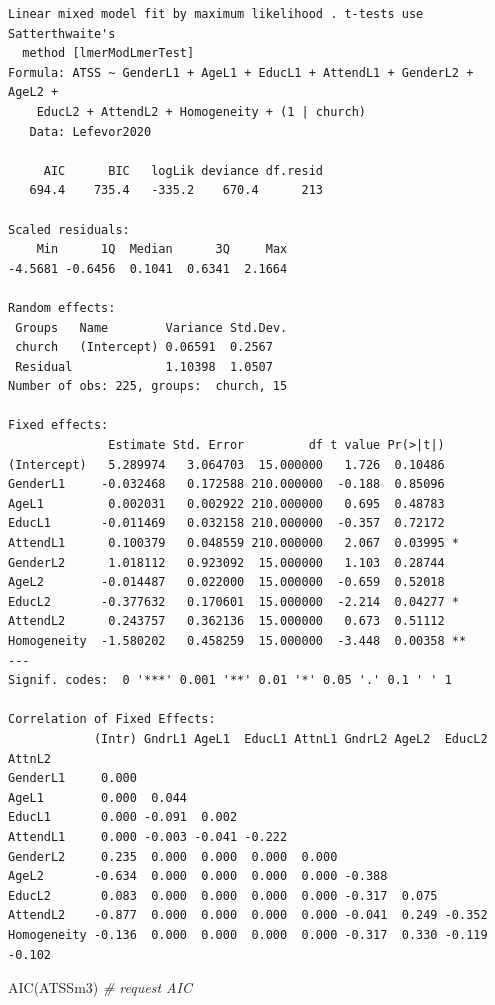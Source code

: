 \documentclass[
  english,
]{book}
\newenvironment{Shaded}{\begin{snugshade}}{\end{snugshade}}
\newcommand{\CommentTok}[1]{\textcolor[rgb]{0.56,0.35,0.01}{\textit{#1}}}
\newcommand{\FunctionTok}[1]{\textcolor[rgb]{0.00,0.00,0.00}{#1}}
\newcommand{\NormalTok}[1]{#1}
\begin{document}
\begin{verbatim}
Linear mixed model fit by maximum likelihood . t-tests use Satterthwaite's
  method [lmerModLmerTest]
Formula: ATSS ~ GenderL1 + AgeL1 + EducL1 + AttendL1 + GenderL2 + AgeL2 +  
    EducL2 + AttendL2 + Homogeneity + (1 | church)
   Data: Lefevor2020

     AIC      BIC   logLik deviance df.resid 
   694.4    735.4   -335.2    670.4      213 

Scaled residuals: 
    Min      1Q  Median      3Q     Max 
-4.5681 -0.6456  0.1041  0.6341  2.1664 

Random effects:
 Groups   Name        Variance Std.Dev.
 church   (Intercept) 0.06591  0.2567  
 Residual             1.10398  1.0507  
Number of obs: 225, groups:  church, 15

Fixed effects:
              Estimate Std. Error         df t value Pr(>|t|)   
(Intercept)   5.289974   3.064703  15.000000   1.726  0.10486   
GenderL1     -0.032468   0.172588 210.000000  -0.188  0.85096   
AgeL1         0.002031   0.002922 210.000000   0.695  0.48783   
EducL1       -0.011469   0.032158 210.000000  -0.357  0.72172   
AttendL1      0.100379   0.048559 210.000000   2.067  0.03995 * 
GenderL2      1.018112   0.923092  15.000000   1.103  0.28744   
AgeL2        -0.014487   0.022000  15.000000  -0.659  0.52018   
EducL2       -0.377632   0.170601  15.000000  -2.214  0.04277 * 
AttendL2      0.243757   0.362136  15.000000   0.673  0.51112   
Homogeneity  -1.580202   0.458259  15.000000  -3.448  0.00358 **
---
Signif. codes:  0 '***' 0.001 '**' 0.01 '*' 0.05 '.' 0.1 ' ' 1

Correlation of Fixed Effects:
            (Intr) GndrL1 AgeL1  EducL1 AttnL1 GndrL2 AgeL2  EducL2 AttnL2
GenderL1     0.000                                                        
AgeL1        0.000  0.044                                                 
EducL1       0.000 -0.091  0.002                                          
AttendL1     0.000 -0.003 -0.041 -0.222                                   
GenderL2     0.235  0.000  0.000  0.000  0.000                            
AgeL2       -0.634  0.000  0.000  0.000  0.000 -0.388                     
EducL2       0.083  0.000  0.000  0.000  0.000 -0.317  0.075              
AttendL2    -0.877  0.000  0.000  0.000  0.000 -0.041  0.249 -0.352       
Homogeneity -0.136  0.000  0.000  0.000  0.000 -0.317  0.330 -0.119 -0.102
\end{verbatim}

\begin{Shaded}
\begin{Highlighting}[]
\FunctionTok{AIC}\NormalTok{(ATSSm3) }\CommentTok{\# request AIC}
\end{Highlighting}
\end{Shaded}
\end{document}
